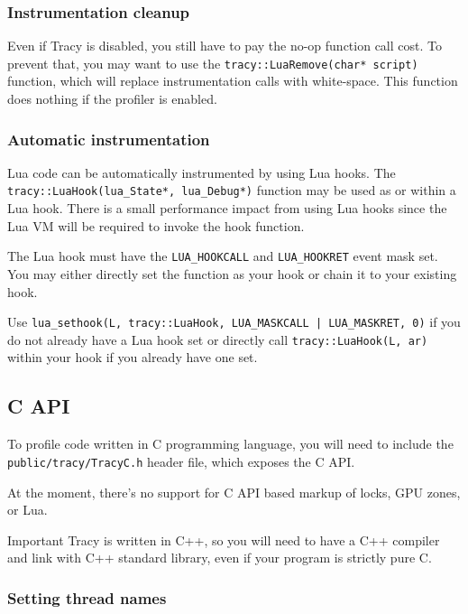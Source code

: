 \documentclass[hidelinks,titlepage,a4paper,twoside]{article}
\begin{document}
\subsubsection{Instrumentation cleanup}

Even if Tracy is disabled, you still have to pay the no-op function call cost. To prevent that, you may want to use the \texttt{tracy::LuaRemove(char* script)} function, which will replace instrumentation calls with white-space. This function does nothing if the profiler is enabled.

\subsubsection{Automatic instrumentation}

Lua code can be automatically instrumented by using Lua hooks. The \texttt{tracy::LuaHook(lua\_State*, lua\_Debug*)} function may be used as or within a Lua hook. There is a small performance impact from using Lua hooks since the Lua VM will be required to invoke the hook function.

The Lua hook must have the \texttt{LUA\_HOOKCALL} and \texttt{LUA\_HOOKRET} event mask set. You may either directly set the function as your hook or chain it to your existing hook.

Use \texttt{lua\_sethook(L, tracy::LuaHook, LUA\_MASKCALL | LUA\_MASKRET, 0)} if you do not already have a Lua hook set or directly call \texttt{tracy::LuaHook(L, ar)} within your hook if you already have one set.

\subsection{C API}
\label{capi}

To profile code written in C programming language, you will need to include the \texttt{public/tracy/TracyC.h} header file, which exposes the C API.

At the moment, there's no support for C API based markup of locks, GPU zones, or Lua.

\begin{bclogo}[
noborder=true,
couleur=black!5,
logo=\bcbombe
]{Important}
Tracy is written in C++, so you will need to have a C++ compiler and link with C++ standard library, even if your program is strictly pure C.
\end{bclogo}

\subsubsection{Setting thread names}
\end{document}
